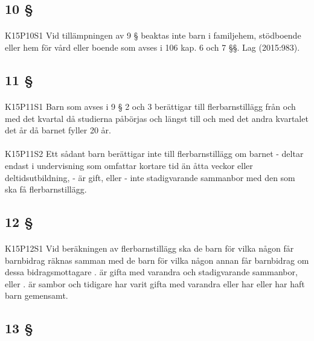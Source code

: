 \documentclass[a4paper,notitlepage,openany,10pt]{book}
\begin{document}
\subsection*{10 §}
\paragraph*{}
{\tiny K15P10S1}
Vid tillämpningen av 9 § beaktas inte barn i familjehem, stödboende eller hem för vård eller boende som avses i 106 kap. 6 och 7 §§.
Lag (2015:983).
\subsection*{11 §}
\paragraph*{}
{\tiny K15P11S1}
Barn som avses i 9 § 2 och 3 berättigar till flerbarnstillägg från och med det kvartal då studierna påbörjas och längst till och med det andra kvartalet det år då barnet fyller 20 år.
\paragraph*{}
{\tiny K15P11S2}
Ett sådant barn berättigar inte till flerbarnstillägg om barnet
\newline - deltar endast i undervisning som omfattar kortare tid än åtta veckor eller deltidsutbildning,
\newline - är gift, eller
\newline - inte stadigvarande sammanbor med den som ska få flerbarnstillägg.
\subsection*{12 §}
\paragraph*{}
{\tiny K15P12S1}
Vid beräkningen av flerbarnstillägg ska de barn för vilka någon får barnbidrag räknas samman med de barn för vilka någon annan får barnbidrag om dessa bidragsmottagare
. är gifta med varandra och stadigvarande sammanbor, eller
. är sambor och tidigare har varit gifta med varandra eller har eller har haft barn gemensamt.
\subsection*{13 §}
\end{document}
